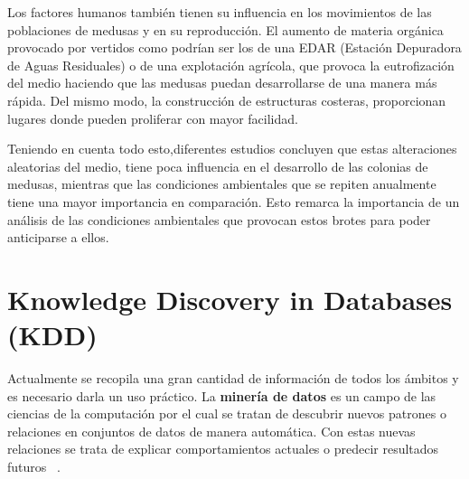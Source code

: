  \cite{canepa_environmental_2017}


Los factores humanos también tienen su influencia en los movimientos de las poblaciones de medusas y en su reproducción. 
El aumento de materia orgánica provocado por vertidos como podrían ser los de una EDAR (Estación Depuradora de Aguas Residuales) o de una explotación agrícola, que provoca la eutrofización del medio haciendo que las medusas puedan desarrollarse de una manera más rápida. Del mismo modo, la construcción de estructuras costeras, proporcionan lugares donde pueden proliferar con mayor facilidad.


Teniendo en cuenta todo esto,diferentes estudios concluyen que estas alteraciones aleatorias del medio, tiene poca influencia en el desarrollo de las colonias de medusas, mientras que las condiciones ambientales que se repiten anualmente tiene una mayor importancia en comparación. Esto remarca la importancia de un análisis de las condiciones ambientales que provocan estos brotes para poder anticiparse a ellos.\cite{art:ArticuloCanepa_1}

\section{Knowledge Discovery in Databases (KDD)}

Actualmente se recopila una gran cantidad de información de todos los ámbitos y es necesario darla un uso práctico. La \textbf{minería de datos} es un campo de las ciencias de la computación por el cual se tratan de descubrir nuevos patrones o relaciones en conjuntos de datos de manera automática. Con estas nuevas relaciones se trata de explicar comportamientos actuales o predecir resultados futuros~ \cite{mineria_tecnicas_herramientas}. 

